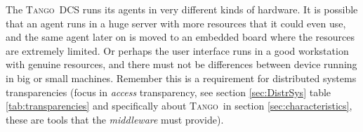 \documentclass[10pt,a4paper,twoside]{llncs}
\newcommand{\todo}[1]{\texttt{\color{red}TODO:} ``\emph{#1}''}
\newcommand{\tango}{\textsc{Tango}}
\begin{document}

The \tango\, DCS runs its agents in very different kinds of hardware. It is possible that an agent runs in a huge server with more resources that it could even use, and the same agent later on is moved to an embedded board where the resources are extremely limited. Or perhaps the user interface runs in a good workstation with genuine resources, and there must not be differences between device running in big or small machines. Remember this is a requirement for distributed systems transparencies (focus in \emph{access} transparency, see section \ref{sec:DistrSys} table \ref{tab:transparencies} and specifically about \tango\, in section \ref{sec:characteristics}, these are tools that the \emph{middleware} must provide).
\end{document}
